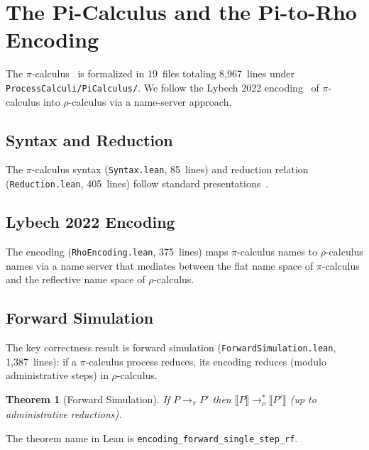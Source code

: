 \documentclass[11pt]{article}
\newtheorem{theorem}{Theorem}[section]
\theoremstyle{definition}
\theoremstyle{remark}
\begin{document}
\section{The Pi-Calculus and the Pi-to-Rho Encoding}
\label{sec:pi}

The $\pi$-calculus~\cite{Milner1999,SangiorgiWalker2001} is formalized
in 19~files totaling 8{,}967~lines under \texttt{ProcessCalculi/PiCalculus/}.
We follow the Lybech 2022 encoding~\cite{Lybech2022} of $\pi$-calculus
into $\rho$-calculus via a name-server approach.

\subsection{Syntax and Reduction}

The $\pi$-calculus syntax (\texttt{Syntax.lean}, 85~lines) and
reduction relation (\texttt{Reduction.lean}, 405~lines) follow
standard presentations~\cite{SangiorgiWalker2001}.

\subsection{Lybech 2022 Encoding}

The encoding (\texttt{RhoEncoding.lean}, 375~lines) maps $\pi$-calculus
names to $\rho$-calculus names via a name server that mediates
between the flat name space of $\pi$-calculus and the reflective name
space of $\rho$-calculus.

\subsection{Forward Simulation}

The key correctness result is forward simulation
(\texttt{ForwardSimulation.lean}, 1{,}387~lines): if a $\pi$-calculus
process reduces, its encoding reduces (modulo administrative steps) in
$\rho$-calculus.

\begin{theorem}[Forward Simulation]
\label{thm:forward-sim}
If $P \to_\pi P'$ then $\llbracket P \rrbracket \to_\rho^* \llbracket P' \rrbracket$
(up to administrative reductions).
\end{theorem}

\noindent
The theorem name in Lean is \texttt{encoding\_forward\_single\_step\_rf}.
\end{document}
